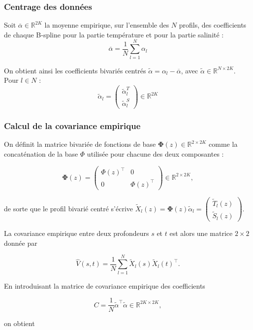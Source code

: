 \documentclass[11pt,a4paper,oneside]{report}
\begin{document}
	\subsubsection{Centrage des données}
	Soit $\overline{\alpha} \in \mathbb{R}^{2K}$ la moyenne empirique, sur l'ensemble des $N$ profils, des coefficients de chaque B-spline pour la partie température et pour la partie salinité :
	\[
	\overline{\alpha} = \frac{1}{N} \sum_{l=1}^{N} \alpha_l
	\]
	
	On obtient ainsi les coefficients bivariés centrés $\tilde{\alpha} =  \alpha_{l} - \overline{\alpha}$, avec $\tilde{\alpha} \in \mathbb{R}^{N \times 2K}$. Pour $l \in N$ : 
	$$
	\tilde\alpha_l
	=
	\begin{pmatrix}
		\tilde\alpha_l^T\\
		\tilde\alpha_l^S
	\end{pmatrix}
	\in\mathbb{R}^{2K}
	$$
	
	\subsubsection{Calcul de la covariance empirique}
	
	On définit la matrice bivariée de fonctions de base $\boldsymbol{\Phi}(z) \in \mathbb{R}^{2\times 2K}$ comme la concaténation de la base $\Phi$ utilisée pour chacune des deux composantes :
	
	$$
	\boldsymbol{\Phi}(z)
	=
	\begin{pmatrix}
		\Phi(z)^\top & 0\\
		0 & \Phi(z)^\top
	\end{pmatrix}
	\in\mathbb{R}^{2\times 2K},
	$$
	
	de sorte que le profil bivarié centré s'écrive $
	\tilde X_l(z)
	=
	\boldsymbol{\Phi}(z)\tilde\alpha_l
	=
	\begin{pmatrix}
		\tilde T_l(z)\\
		\tilde S_l(z)
	\end{pmatrix}.
	$
	
	La covariance empirique entre deux profondeurs $s$ et $t$ est alors une matrice $2\times2$ donnée par
	
	$$
	\hat V(s,t)
	=
	\frac{1}{N}
	\sum_{l=1}^N
	\tilde X_l(s)\tilde X_l(t)^\top.
	$$
	
	En introduisant la matrice de covariance empirique des coefficients
	
	$$
	C
	=
	\frac{1}{N}\tilde\alpha^\top\tilde\alpha
	\in\mathbb{R}^{2K\times2K},
	$$
	
	on obtient
	
\end{document}
